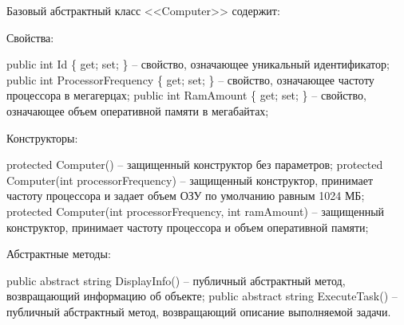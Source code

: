 \documentclass[oneside,14pt,a4paper]{extarticle}
\renewcommand{\item}{\itemindent1.25cm\itemold}
\begin{document}
  Базовый абстрактный класс <<Computer>> содержит:
  \begin{itemize}
    \item[--] Свойства:
    \begin{itemize}
      \item[--] public int Id \{ get; set; \} -- свойство, означающее уникальный идентификатор;
      \item[--] public int ProcessorFrequency \{ get; set; \} -- свойство, означающее частоту процессора в мегагерцах;
      \item[--] public int RamAmount \{ get; set; \} -- свойство, означающее объем оперативной памяти в мегабайтах;
    \end{itemize}
    \item[--] Конструкторы:
    \begin{itemize}
      \item[--] protected Computer() -- защищенный конструктор без параметров;
      \item[--] protected Computer(int processorFrequency) -- защищенный конструктор, принимает частоту процессора и задает объем ОЗУ по умолчанию равным 1024 МБ;
      \item[--] protected Computer(int processorFrequency, int ramAmount) -- защищенный конструктор, принимает частоту процессора и объем оперативной памяти;
    \end{itemize}
    \item[--] Абстрактные методы:
    \begin{itemize}
      \item[--] public abstract string DisplayInfo() -- публичный абстрактный метод, возвращающий информацию об объекте;
      \item[--] public abstract string ExecuteTask() -- публичный абстрактный метод, возвращающий описание выполняемой задачи.
    \end{itemize}
  \end{itemize}
\end{document}
